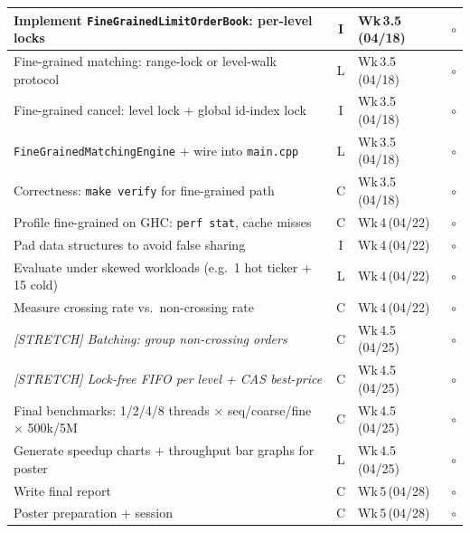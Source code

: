 \documentclass[11pt]{article}
\begin{document}
\begin{longtable}{|p{8.5cm}|c|l|c|}
Implement \texttt{FineGrainedLimitOrderBook}: per-level locks
  & I & Wk\,3.5\,(04/18) & $\circ$ \\ \hline
Fine-grained matching: range-lock or level-walk protocol
  & L & Wk\,3.5\,(04/18) & $\circ$ \\ \hline
Fine-grained cancel: level lock + global id-index lock
  & I & Wk\,3.5\,(04/18) & $\circ$ \\ \hline
\texttt{FineGrainedMatchingEngine} + wire into \texttt{main.cpp}
  & L & Wk\,3.5\,(04/18) & $\circ$ \\ \hline
Correctness: \texttt{make verify} for fine-grained path
  & C & Wk\,3.5\,(04/18) & $\circ$ \\ \hline

\rowcolor{gray!8}
Profile fine-grained on GHC: \texttt{perf stat}, cache misses
  & C & Wk\,4\,(04/22) & $\circ$ \\ \hline
\rowcolor{gray!8}
Pad data structures to avoid false sharing
  & I & Wk\,4\,(04/22) & $\circ$ \\ \hline
\rowcolor{gray!8}
Evaluate under skewed workloads (e.g.\ 1 hot ticker + 15 cold)
  & L & Wk\,4\,(04/22) & $\circ$ \\ \hline
\rowcolor{gray!8}
Measure crossing rate vs.\ non-crossing rate
  & C & Wk\,4\,(04/22) & $\circ$ \\ \hline

\textit{[STRETCH] Batching: group non-crossing orders}
  & C & Wk\,4.5\,(04/25) & $\circ$ \\ \hline
\textit{[STRETCH] Lock-free FIFO per level + CAS best-price}
  & C & Wk\,4.5\,(04/25) & $\circ$ \\ \hline
Final benchmarks: 1/2/4/8 threads $\times$ seq/coarse/fine $\times$ 500k/5M
  & C & Wk\,4.5\,(04/25) & $\circ$ \\ \hline
Generate speedup charts + throughput bar graphs for poster
  & L & Wk\,4.5\,(04/25) & $\circ$ \\ \hline

\rowcolor{gray!8}
Write final report
  & C & Wk\,5\,(04/28) & $\circ$ \\ \hline
\rowcolor{gray!8}
Poster preparation + session
  & C & Wk\,5\,(04/28) & $\circ$ \\ \hline

\end{longtable}

\normalsize
\end{document}

